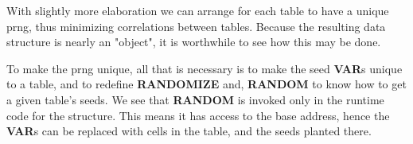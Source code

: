 With slightly more elaboration we can arrange for each table to 
have a unique prng, thus minimizing correlations between
tables. Because the resulting data structure is nearly an "object",
it is worthwhile to see how this may be done.

To make the prng unique, all that is necessary is to make the seed
\textbf{VAR}s unique to a table, and to redefine \textbf{RANDOMIZE} and,
\textbf{RANDOM} to know how to get a given table's seeds. We see that
\textbf{RANDOM} is invoked only in the runtime code for the structure.
This means it has access to the base address, hence the \textbf{VAR}s
can be replaced with cells in the table, and the seeds planted there.

